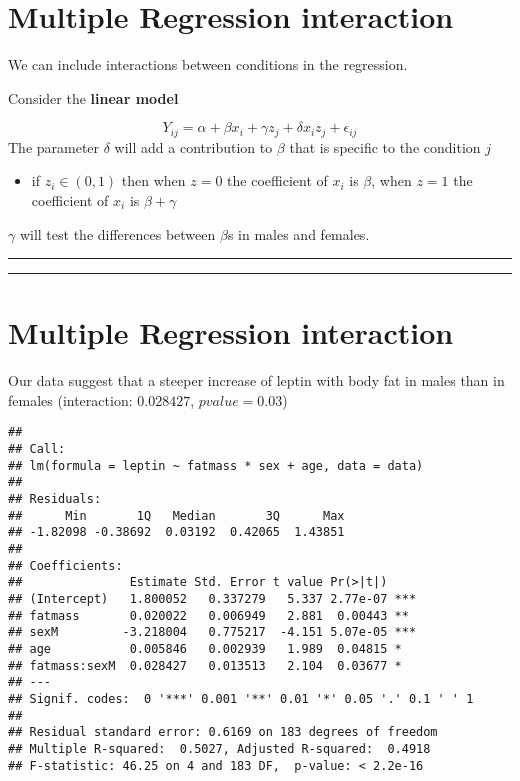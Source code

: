 \documentclass[
]{book}
\providecommand{\tightlist}{%
  \setlength{\itemsep}{0pt}\setlength{\parskip}{0pt}}
\begin{document}
\hypertarget{multiple-regression-interaction}{%
\section{Multiple Regression interaction}\label{multiple-regression-interaction}}

We can include interactions between conditions in the regression.

Consider the \textbf{linear model}

\[Y_{ij} = \alpha + \beta x_{i} +\gamma z_j + \delta x_{i}z_j +\epsilon_{ij}\]
The parameter \(\delta\) will add a contribution to \(\beta\) that is specific to the condition \(j\)

\begin{itemize}
\tightlist
\item
  if \(z_i \in (0,1)\) then when \(z=0\) the coefficient of \(x_i\) is \(\beta\), when \(z=1\) the coefficient of \(x_i\) is \(\beta+\gamma\)
\end{itemize}

\(\gamma\) will test the differences between \(\beta\)s in males and females.

\begin{center}\rule{0.5\linewidth}{0.5pt}\end{center}

\begin{center}\rule{0.5\linewidth}{0.5pt}\end{center}

\hypertarget{multiple-regression-interaction-1}{%
\section{Multiple Regression interaction}\label{multiple-regression-interaction-1}}

Our data suggest that a steeper increase of leptin with body fat in males than in females (interaction: \(0.028427\), \(pvalue=0.03\))

\begin{verbatim}
## 
## Call:
## lm(formula = leptin ~ fatmass * sex + age, data = data)
## 
## Residuals:
##      Min       1Q   Median       3Q      Max 
## -1.82098 -0.38692  0.03192  0.42065  1.43851 
## 
## Coefficients:
##               Estimate Std. Error t value Pr(>|t|)    
## (Intercept)   1.800052   0.337279   5.337 2.77e-07 ***
## fatmass       0.020022   0.006949   2.881  0.00443 ** 
## sexM         -3.218004   0.775217  -4.151 5.07e-05 ***
## age           0.005846   0.002939   1.989  0.04815 *  
## fatmass:sexM  0.028427   0.013513   2.104  0.03677 *  
## ---
## Signif. codes:  0 '***' 0.001 '**' 0.01 '*' 0.05 '.' 0.1 ' ' 1
## 
## Residual standard error: 0.6169 on 183 degrees of freedom
## Multiple R-squared:  0.5027, Adjusted R-squared:  0.4918 
## F-statistic: 46.25 on 4 and 183 DF,  p-value: < 2.2e-16
\end{verbatim}
\end{document}
